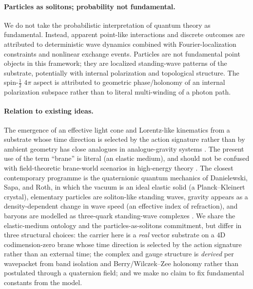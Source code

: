 \paragraph{Particles as solitons; probability not fundamental.}
We do not take the probabilistic interpretation of quantum theory as fundamental.
Instead, apparent point-like interactions and discrete outcomes are attributed to deterministic wave dynamics
combined with Fourier-localization constraints and nonlinear exchange events.
Particles are not fundamental point objects in this framework; they are localized standing-wave patterns of the
substrate, potentially with internal polarization and topological structure.
The spin-$\tfrac12$ $4\pi$ aspect is attributed to geometric phase/holonomy of an internal polarization
subspace rather than to literal multi-winding of a photon path.

\paragraph{Relation to existing ideas.}
The emergence of an effective light cone and Lorentz-like kinematics from a substrate whose time direction is selected by the action signature rather than by ambient geometry has close analogues in analogue-gravity systems \citep{Barcelo2011AnalogueGravity,Volovik2003HeliumDroplet,Jacobson2004EinsteinAether}.
The present use of the term ``brane'' is literal (an elastic medium), and should not be confused with
field-theoretic brane-world scenarios in high-energy theory \citep{RandallSundrum1999}.
The closest contemporary programme is the quaternionic quantum mechanics of Danielewski, Sapa, and Roth, in which
the vacuum is an ideal elastic solid (a Planck--Kleinert crystal), elementary particles are soliton-like standing
waves, gravity appears as a density-dependent change in wave speed (an effective index of refraction), and baryons
are modelled as three-quark standing-wave complexes \citep{Roth2023QQM2,DanielewskiRoth2024Baryons}.
We share the elastic-medium ontology and the particles-as-solitons commitment, but differ in three structural choices:
the carrier here is a \emph{real} vector substrate on a $4$D codimension-zero brane whose time direction is selected by
the action signature rather than an external time; the complex and gauge structure is \emph{derived} per wavepacket
from band isolation and Berry/Wilczek--Zee holonomy rather than postulated through a quaternion field; and we make no
claim to fix fundamental constants from the model.

